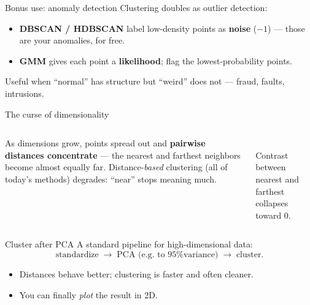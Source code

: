 \documentclass[aspectratio=169]{beamer}
\begin{document}
\begin{frame}{Bonus use: anomaly detection}
  Clustering doubles as outlier detection:
  \begin{itemize}\small
    \item \textbf{DBSCAN / HDBSCAN} label low-density points as \textbf{noise} ($-1$) --- those are
      your anomalies, for free.
    \item \textbf{GMM} gives each point a \textbf{likelihood}; flag the lowest-probability points.
  \end{itemize}
  \vfill
  \footnotesize Useful when ``normal'' has structure but ``weird'' does not --- fraud, faults, intrusions.
\end{frame}

\begin{frame}{The curse of dimensionality}
  \begin{columns}[T]
    As dimensions grow, points spread out and \textbf{pairwise distances concentrate} --- the
    nearest and farthest neighbors become almost equally far.
    \vskip 4pt
    Distance-\emph{based} clustering (all of today's methods) degrades: ``near'' stops meaning much.
    \vskip 6pt
    \begin{center}\small
      \\[-2pt]
      \scriptsize Contrast between nearest and farthest collapses toward $0$.
    \end{center}
  \end{columns}
\end{frame}

\begin{frame}{Cluster after PCA}
  A standard pipeline for high-dimensional data:
  \[ \text{standardize} \;\to\; \text{PCA (e.g. to 95\% variance)} \;\to\; \text{cluster} . \]
  \begin{itemize}\small
    \item Distances behave better; clustering is faster and often cleaner.
    \item You can finally \emph{plot} the result in 2D.
  \end{itemize}
  \vfill
\end{frame}
\end{document}
